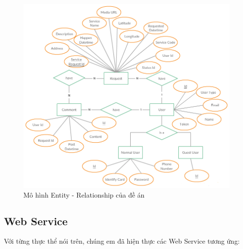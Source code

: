 \documentclass[a4paper]{article}
\begin{document}
\begin{center}
    \begin{figure}[h]
    \begin{center}
     \includegraphics[scale=.65]{entity-diagram.png}
    \end{center}
    \caption{Mô hình Entity - Relationship của đề án}
    \label{refhinh1}
    \end{figure}
\end{center}

\newpage

\subsection{Web Service}
Với từng thực thể nói trên, chúng em đã hiện thực các Web Service tương ứng:
\end{document}
